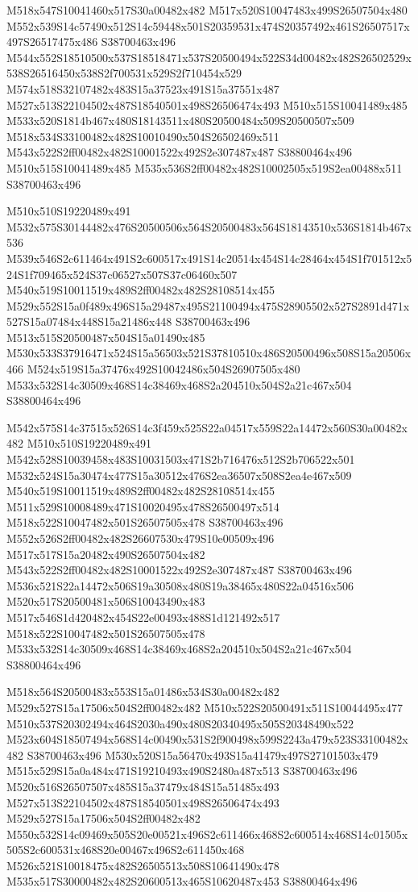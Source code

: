 \documentclass{article}
\begin{document}
\begin{multicols}{2}
M518x547S10041460x517S30a00482x482 M517x520S10047483x499S26507504x480 M552x539S14c57490x512S14c59448x501S20359531x474S20357492x461S26507517x497S26517475x486 S38700463x496 M544x552S18510500x537S18518471x537S20500494x522S34d00482x482S26502529x538S26516450x538S2f700531x529S2f710454x529 M574x518S32107482x483S15a37523x491S15a37551x487 M527x513S22104502x487S18540501x498S26506474x493 M510x515S10041489x485 M533x520S1814b467x480S18143511x480S20500484x509S20500507x509 M518x534S33100482x482S10010490x504S26502469x511 M543x522S2ff00482x482S10001522x492S2e307487x487 S38800464x496 M510x515S10041489x485 M535x536S2ff00482x482S10002505x519S2ea00488x511 S38700463x496

M510x510S19220489x491 M532x575S30144482x476S20500506x564S20500483x564S18143510x536S1814b467x536 M539x546S2c611464x491S2c600517x491S14c20514x454S14c28464x454S1f701512x524S1f709465x524S37c06527x507S37c06460x507 M540x519S10011519x489S2ff00482x482S28108514x455 M529x552S15a0f489x496S15a29487x495S21100494x475S28905502x527S2891d471x527S15a07484x448S15a21486x448 S38700463x496 M513x515S20500487x504S15a01490x485 M530x533S37916471x524S15a56503x521S37810510x486S20500496x508S15a20506x466 M524x519S15a37476x492S10042486x504S26907505x480 M533x532S14c30509x468S14c38469x468S2a204510x504S2a21c467x504 S38800464x496

M542x575S14c37515x526S14c3f459x525S22a04517x559S22a14472x560S30a00482x482 M510x510S19220489x491 M542x528S10039458x483S10031503x471S2b716476x512S2b706522x501 M532x524S15a30474x477S15a30512x476S2ea36507x508S2ea4e467x509 M540x519S10011519x489S2ff00482x482S28108514x455 M511x529S10008489x471S10020495x478S26500497x514 M518x522S10047482x501S26507505x478 S38700463x496 M552x526S2ff00482x482S26607530x479S10e00509x496 M517x517S15a20482x490S26507504x482 M543x522S2ff00482x482S10001522x492S2e307487x487 S38700463x496 M536x521S22a14472x506S19a30508x480S19a38465x480S22a04516x506 M520x517S20500481x506S10043490x483 M517x546S1d420482x454S22e00493x488S1d121492x517 M518x522S10047482x501S26507505x478 M533x532S14c30509x468S14c38469x468S2a204510x504S2a21c467x504 S38800464x496

M518x564S20500483x553S15a01486x534S30a00482x482 M529x527S15a17506x504S2ff00482x482 M510x522S20500491x511S10044495x477 M510x537S20302494x464S2030a490x480S20340495x505S20348490x522 M523x604S18507494x568S14c00490x531S2f900498x599S2243a479x523S33100482x482 S38700463x496 M530x520S15a56470x493S15a41479x497S27101503x479 M515x529S15a0a484x471S19210493x490S2480a487x513 S38700463x496 M520x516S26507507x485S15a37479x484S15a51485x493 M527x513S22104502x487S18540501x498S26506474x493 M529x527S15a17506x504S2ff00482x482 M550x532S14c09469x505S20e00521x496S2c611466x468S2c600514x468S14c01505x505S2c600531x468S20e00467x496S2c611450x468 M526x521S10018475x482S26505513x508S10641490x478 M535x517S30000482x482S20600513x465S10620487x453 S38800464x496


\end{multicols}
\end{document}
